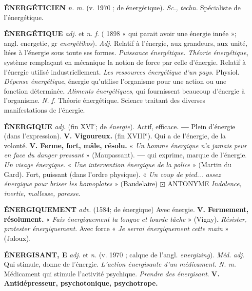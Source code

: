 \vspace{0.24cm}
{\footnotesize 
{\bf ÉNERGÉTICIEN} {\it n. m.} (v. 1970 ; de énergétique). {\it Sc., techn.} Spécialiste de l'énergétique.

{\bf ÉNERGÉTIQUE} {\it adj.} et {\it n. f.} ( 1898 « qui parait avoir une énergie innée »; angl. energetic, gr {\it energêtikos}).  {\it Adj.} Relatif à l'énergie, aux grandeurs, aux unité, liées à l'énergie sous toute ses formes. {\it Puissance énergétique. Théorie énergétique}, système remplaçant en mécanique la notion de force par celle d'énergie. \lb Relatif à l'énergie utilisé industriellement. {\it Les ressources énergétique d'un pays.} \lb Physiol. {\it Dépense énergétique}, énergie qu'utilise l'organisme pour une action ou une fonction déterminée. {\it Aliments énergétiques}, qui fournissent beaucoup d'énergie à l'organisme.  {\it N. f.} Théorie énergétique. Science traitant des diverses manifestations de l'énergie.

{\bf ÉNERGIQUE} {\it adj.} (fin {\footnotesize XVI}$^\text{e}$; de {\it énergie}).  Actif, efficace.  {\bf —} Plein d'énergie (dans l'expression). {\bf V. Vigoureux.} (fin {\footnotesize XVIII}$^\text{e}$). Qui a de l'énergie, de la volonté. {\bf V. Ferme, fort, mâle, résolu.} « {\it Un homme énergique n'a jamais peur en face du danger pressant} » ({\sc Maupassant}). {\bf —} qui exprime, marque de l'énergie. {\it Un visage énergique.} « {\it Une intervention énergique de la police} » ({\sc Martin du Gard}). \lb Fort, puissant (dans l'ordre physique). « {\it Un coup de pied... assez énergique pour briser les homoplates} » ({\sc Baudelaire}) $\boxdot$ {\sc ANTONYME} \textit{\textsf{Indolence, inertie, mollesse, paresse.}}

{\bf ÉNERGIQUEMENT} {\it adv.} (1584; de énergique) Avec énergie. {\bf V. Fermement, résolument.} « {\it Fais énergiquement ta longue et lourde tâche} » ({\sc Vigny}). {\it Résister, protester énergiquement.} \lb Avec force « {\it Je serrai énergiquement cette main} » ({\sc Jaloux}).

{\bf ÉNERGISANT, E} {\it adj.} et {\it n.} (v. 1970 ; calque de l'angl. {\it energizing}). {\it Méd.}  {\it adj.} Qui stimule, donne de l'énergie. {\it L'action énergisante d'un médicament.}  {\it N. m.} Médicament qui stimule l'activité psychique. {\it Prendre des énergisant}. {\bf V. Antidépresseur, psychotonique, psychotrope.}
}
\vspace{0.31cm}

